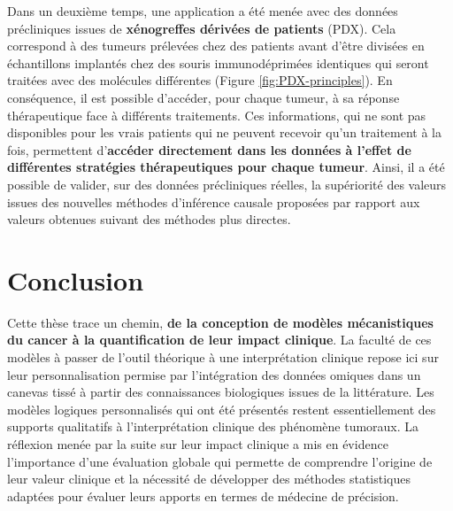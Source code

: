 \documentclass[a4paper,12pt,twoside,onecolumn,openright,final,oldfontcommands]{memoir}
\begin{document}
Dans un deuxième temps, une application a été menée avec des données
précliniques issues de \textbf{xénogreffes dérivées de patients} (PDX).
Cela correspond à des tumeurs prélevées chez des patients avant d'être
divisées en échantillons implantés chez des souris immunodéprimées
identiques qui seront traitées avec des molécules différentes (Figure
\ref{fig:PDX-principles}). En conséquence, il est possible d'accéder,
pour chaque tumeur, à sa réponse thérapeutique face à différents
traitements. Ces informations, qui ne sont pas disponibles pour les
vrais patients qui ne peuvent recevoir qu'un traitement à la fois,
permettent d'\textbf{accéder directement dans les données à l'effet de
différentes stratégies thérapeutiques pour chaque tumeur}. Ainsi, il a
été possible de valider, sur des données précliniques réelles, la
supériorité des valeurs issues des nouvelles méthodes d'inférence
causale proposées par rapport aux valeurs obtenues suivant des méthodes
plus directes.

\section{Conclusion}\label{conclusion-1}

Cette thèse trace un chemin, \textbf{de la conception de modèles
mécanistiques du cancer à la quantification de leur impact clinique}. La
faculté de ces modèles à passer de l'outil théorique à une
interprétation clinique repose ici sur leur personnalisation permise par
l'intégration des données omiques dans un canevas tissé à partir des
connaissances biologiques issues de la littérature. Les modèles logiques
personnalisés qui ont été présentés restent essentiellement des supports
qualitatifs à l'interprétation clinique des phénomène tumoraux. La
réflexion menée par la suite sur leur impact clinique a mis en évidence
l'importance d'une évaluation globale qui permette de comprendre
l'origine de leur valeur clinique et la nécessité de développer des
méthodes statistiques adaptées pour évaluer leurs apports en termes de
médecine de précision.


\end{document}
